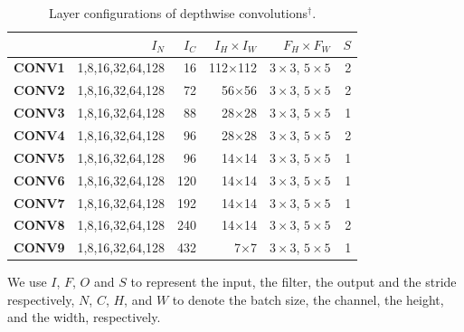 \begin{table}[]
\caption{Layer configurations of depthwise  convolutions$^{\dag}$.}
\label{tab:depconvconfigs}
\centering
{}
\begin{threeparttable}
\begin{tabular}{lrrrrr}
\toprule
& \textbf{$I_N$} & \textbf{$I_C$} & \textbf{$I_H \times I_W$ }&  \textbf{$F_H \times F_W$} &\textbf{$S$}\\
\midrule
\textbf{CONV1} & 1,8,16,32,64,128  & 16    & 112$\times$112 & $3 \times 3$, $5 \times 5$&2  \\
\textbf{CONV2} & 1,8,16,32,64,128  & 72    & 56$\times$56  &$3 \times 3$, $5 \times 5$  &2 \\
\textbf{CONV3} & 1,8,16,32,64,128  & 88   & 28$\times$28  &$3 \times 3$, $5 \times 5$   &1 \\
\textbf{CONV4} & 1,8,16,32,64,128  & 96    & 28$\times$28  &$3 \times 3$, $5 \times 5$  &2  \\
\textbf{CONV5} & 1,8,16,32,64,128  & 96   & 14$\times$14  &$3 \times 3$, $5 \times 5$   &1 \\
\textbf{CONV6} & 1,8,16,32,64,128  & 120   & 14$\times$14  &$3 \times 3$, $5 \times 5$  &1  \\
\textbf{CONV7} & 1,8,16,32,64,128  & 192   & 14$\times$14  &$3 \times 3$, $5 \times 5$  &1  \\
\textbf{CONV8} & 1,8,16,32,64,128  & 240   & 14$\times$14  &$3 \times 3$, $5 \times 5$  &2  \\
\textbf{CONV9} & 1,8,16,32,64,128  & 432   & 7$\times$7  &$3 \times 3$, $5 \times 5$    &1\\

\bottomrule
\end{tabular}
\footnotesize
\begin{tablenotes}
\item[\dag] We use $I$, $F$, $O$ and $S$ to represent the input, the filter, the output and the stride respectively, $N$, $C$, $H$, and $W$
to denote the batch size, the channel, the height, and the width, respectively.
\end{tablenotes}
\end{threeparttable}
\vspace{-5mm}
\end{table}

